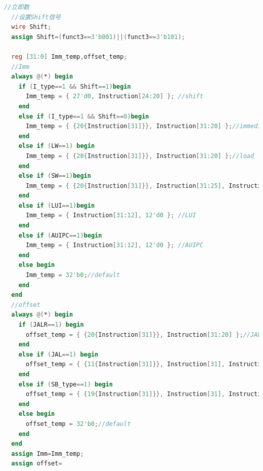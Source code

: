 \documentclass[12pt,hyperref,a4paper,UTF8]{ctexart}
\begin{document}
\begin{lstlisting}[language=Verilog,caption=立即数]
  //立即数
  //设置Shift信号
  wire Shift;
  assign Shift=(funct3==3'b001)||(funct3==3'b101);

  reg [31:0] Imm_temp,offset_temp;
  //Imm
  always @(*) begin
    if (I_type==1 && Shift==1)begin
      Imm_temp = { 27'd0, Instruction[24:20] }; //shift
    end
    else if (I_type==1 && Shift==0)begin
      Imm_temp = { {20{Instruction[31]}}, Instruction[31:20] };//immediate
    end
    else if (LW==1) begin
      Imm_temp = { {20{Instruction[31]}}, Instruction[31:20] };//load
    end
    else if (SW==1)begin
      Imm_temp = { {20{Instruction[31]}}, Instruction[31:25], Instruction[11:7] }; //store
    end
    else if (LUI==1)begin
      Imm_temp = { Instruction[31:12], 12'd0 }; //LUI
    end
    else if (AUIPC==1)begin
      Imm_temp = { Instruction[31:12], 12'd0 }; //AUIPC
    end
    else begin
      Imm_temp = 32'b0;//default
    end
  end
  //offset
  always @(*) begin
    if (JALR==1) begin
      offset_temp = { {20{Instruction[31]}}, Instruction[31:20] };//JALR
    end
    else if (JAL==1) begin
      offset_temp = { {11{Instruction[31]}}, Instruction[31], Instruction[19:12], Instruction[20], Instruction[30:21], 1'b0 };//JAL
    end
    else if (SB_type==1) begin
      offset_temp = { {19{Instruction[31]}}, Instruction[31], Instruction[7], Instruction[30:25], Instruction[11:8], 1'b0 };//SB
    end
    else begin
      offset_temp = 32'b0;//default
    end
  end
  assign Imm=Imm_temp;
  assign offset=
\end{lstlisting}
\end{document}
